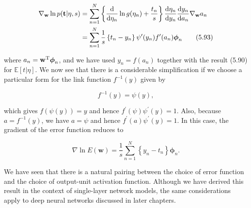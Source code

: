 \documentclass{article}
\begin{document}
\begin{align}
\nabla_{\mathbf{w}}\ln p(\mathbf{t}|\eta,s) &= \sum_{n=1}^{N}\left\{\frac{{\rm d}}{{\rm d}\eta_{n}}\ln g(\eta_{n})+\frac{t_{n}}{s}\right\}\frac{{\rm d}\eta_{n}}{{\rm d}y_{n}}\frac{{\rm d}y_{n}}{{\rm d}a_{n}}\nabla_{\mathbf{w}}a_{n} \\
&= \sum_{n=1}^{N}\frac{1}{s}\left\{t_{n}-y_{n}\right\}\psi^{\prime}(y_{n})f^{\prime}(a_{n})\boldsymbol{\phi}_{n}
\tag{5.93}
\end{align}

where $a_{n}=\mathbf{w}^{\rm T}\boldsymbol{\phi}_{n}$, and we have used $y_{n}=f(a_{n})$ together with the result (5.90) for $\mathbb{E}[t|\eta]$. We now see that there is a considerable simplification if we choose a particular form for the link function $f^{-1}(y)$ given by

\begin{equation}
f^{-1}(y)=\psi(y),
\tag{5.94}
\end{equation}

which gives $f(\psi(y))=y$ and hence $f^{\prime}(\psi)\psi^{\prime}(y)=1$. Also, because $a=f^{-1}(y)$, we have $a=\psi$ and hence $f^{\prime}(a)\psi^{\prime}(y)=1$. In this case, the gradient of the error function reduces to

\begin{equation}
\nabla\ln E(\mathbf{w})=\frac{1}{s}\sum_{n=1}^{N}\left\{y_{n}-t_{n}\right\}\boldsymbol{\phi}_{n}.
\tag{5.95}
\end{equation}

We have seen that there is a natural pairing between the choice of error function and the choice of output-unit activation function. Although we have derived this result in the context of single-layer network models, the same considerations apply to deep neural networks discussed in later chapters.
\end{document}
